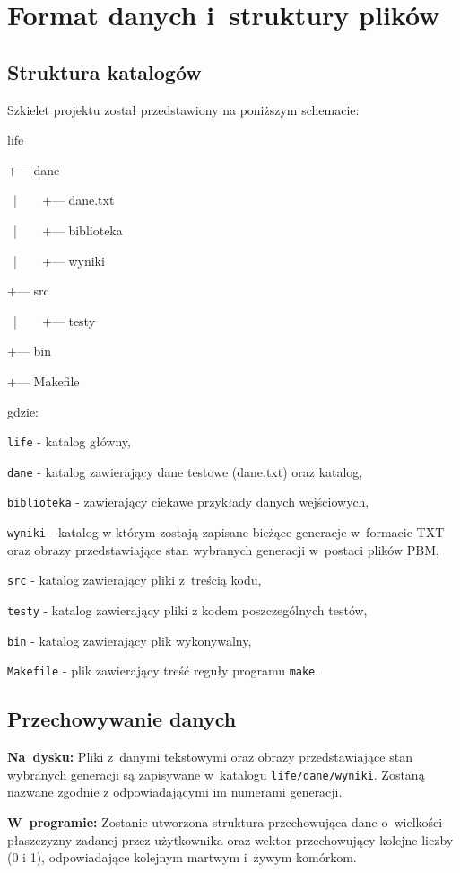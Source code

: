 \documentclass[a4paper,12pt,oneside]{article}
\begin{document}
\section{Format danych i~struktury plików}


\subsection{Struktura katalogów}

Szkielet projektu został przedstawiony na poniższym schemacie: \newline

\par life
\par +--- dane
\par \ |\ \ \ \   +--- dane.txt
\par \ |\ \ \ \   +--- biblioteka
\par \ |\ \ \ \   +--- wyniki
\par +--- src
\par \ |\ \ \ \   +--- testy
\par +--- bin
\par +--- Makefile
\newline

gdzie: \par \verb+life+ - katalog główny,
\par \verb+dane+ - katalog zawierający dane testowe (dane.txt) oraz katalog,
\par \verb+biblioteka+ - zawierający ciekawe przykłady danych wejściowych,
\par \verb+wyniki+ - katalog w którym zostają zapisane bieżące generacje w~formacie TXT oraz obrazy przedstawiające stan wybranych generacji w~postaci plików PBM,
\par \verb+src+ - katalog zawierający pliki z~treścią kodu,
\par \verb+testy+ - katalog zawierający pliki z kodem poszczególnych testów,
\par \verb+bin+ - katalog zawierający plik wykonywalny,
\par \verb+Makefile+ - plik zawierający treść reguły programu \verb+make+.


\subsection{Przechowywanie danych}
\textbf{Na~dysku:}
Pliki z~danymi tekstowymi oraz obrazy przedstawiające stan wybranych generacji są zapisywane w~katalogu \verb+life/dane/wyniki+. Zostaną nazwane zgodnie z odpowiadającymi im numerami generacji.
\newline
\par \textbf{W~programie:}
Zostanie utworzona struktura przechowująca dane o~wielkości płaszczyzny zadanej przez użytkownika oraz wektor przechowujący kolejne liczby (0 i 1), odpowiadające kolejnym martwym i~żywym komórkom.
\end{document}
